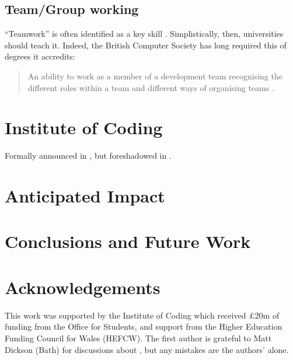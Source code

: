 \documentclass[sigconf]{acmart}
\begin{document}
\subsection{Team/Group working}
``Teamwork'' is often identified as a key skill \cite[and many others]{ArcherDavidson2008}. Simplistically, then, universities should teach it. Indeed, the British Computer Society has long required this of degrees it accredits:
\begin{quote}
An ability to work as a member of a development team recognising the different roles within a team and different ways of organising teams \cite[Requirement 2.3.1]{BCS2018a}.
\end{quote}
\section{Institute of Coding}
Formally announced in \cite{DfE2018a}, but foreshadowed in \cite{HMG2015a}.


\section{Anticipated Impact}

\section{Conclusions and Future Work}


\section{Acknowledgements}
This work was supported by the Institute of Coding which received
\pounds20m of funding from the Office for Students, and support from
the Higher Education Funding Council for Wales (HEFCW).  The first
author is grateful to Matt Dickson (Bath) for discussions about
\cite{DfE2018d}, but any mistakes are the authors' alone.



 
\end{document}
